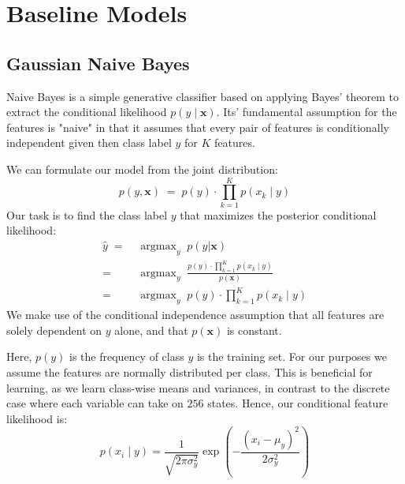 \documentclass{article}
\DeclareMathOperator*{\argmax}{argmax}
\begin{document}

\section{Baseline Models}
\label{sec:baseline-models}
\subsection{Gaussian Naive Bayes}
\label{sec:NB}
Naive Bayes is a simple generative classifier based on applying Bayes' theorem
to extract the conditional likelihood $p(y \mid \mathbf{x})$. Its' fundamental
assumption for the features is "naive" in that it assumes that every pair of
features is conditionally independent given then class label $y$ for $K$ features.

We can formulate our model from the joint distribution:
\begin{equation}
    p(y, \mathbf{x}) \; = \; p(y) \cdot \prod_{k=1}^K p(x_k \mid y)
\end{equation}
Our task is to find the class label $y$ that maximizes the posterior conditional
likelihood:
\begin{equation}
  \begin{aligned}
    \hat{y} \; = \; & \argmax_y \; p(y | \mathbf{x}) \\
    = \; & \argmax_y \; \frac{p(y) \cdot \prod_{k=1}^K p(x_k \mid y)}{p(\mathbf{x})} \\
    = \; & \argmax_y \; p(y) \cdot \prod_{k=1}^K p(x_k \mid y)
  \end{aligned}
\end{equation}
We make use of the conditional independence assumption that all features
are solely dependent on $y$ alone, and that $p(\mathbf{x})$ is constant.

Here, $p(y)$ is the frequency of class $y$ is the training set.
For our purposes we assume the features are normally distributed per class.
This is beneficial for learning, as we learn class-wise means and variances,
in contrast to the discrete case where each variable can take on $256$ states.
Hence, our conditional feature likelihood is:
\begin{equation}
  p(x_i \mid y) = \frac{1}{\sqrt{2\pi\sigma^2_y}} \exp\left(-\frac{(x_i - \mu_y)^2}{2\sigma^2_y}\right)
\end{equation}
\end{document}

